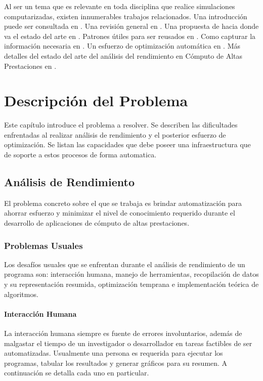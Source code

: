 \documentclass[a4paper]{report}
\begin{document}
\bigskip

Al ser un tema que es relevante en toda disciplina que realice simulaciones computarizadas, existen innumerables trabajos relacionados.
Una introducción puede ser consultada en \cite{intro}. Una revisión general en \cite{overview}. Una propuesta de hacia donde va el estado del arte en \cite{future}. Patrones útiles para ser reusados en \cite{patterns}. Como capturar la información necesaria en \cite{capturing}. Un esfuerzo de optimización automática en \cite{automatic}. Más detalles del estado del arte del análisis del rendimiento en Cómputo de Altas Prestaciones en \cite{hybrid}.

\chapter{Descripción del Problema} \label{Descripcion del Problema}

Este capítulo introduce el problema a resolver. Se describen las dificultades enfrentadas al realizar análisis de rendimiento y el posterior esfuerzo de optimización. Se listan las capacidades que debe poseer una infraestructura que de soporte a estos procesos de forma automatica.


\section{Análisis de Rendimiento}

El problema concreto sobre el que se trabaja es brindar automatización para ahorrar esfuerzo y minimizar el nivel de conocimiento requerido durante el desarrollo de aplicaciones de cómputo de
altas prestaciones.

\subsection{Problemas Usuales}

Los desafíos usuales que se enfrentan durante el análisis de rendimiento de un programa son: interacción humana, manejo de herramientas, recopilación de datos y su representación resumida,
optimización temprana e implementación teórica de algoritmos.

\subsubsection{Interacción Humana}

La interacción humana siempre es fuente de errores involuntarios, además de malgastar el tiempo de un investigador o desarrollador en tareas factibles de ser automatizadas. Usualmente una persona es requerida para ejecutar los programas, tabular los resultados y generar gráficos para su resumen. A continuación se detalla cada uno en particular.
\end{document}
